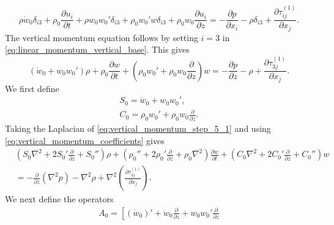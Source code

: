 \documentclass[11pt]{article}
\newenvironment{appen}{\appendix}{}
\begin{document}
\begin{appen}
\begin{equation}
  \rho \dot w_0\delta_{i3}
  + \rho_0 \frac{\partial u_i}{\partial t}
  + \rho w_0 w_0'\delta_{i3}
  + \rho_0 w_0' w \delta_{i3}
  + \rho_0 w_0 \frac{\partial u_i}{\partial z}
  =
  - \frac{\partial p}{\partial x_i}
  - \rho \delta_{i3}
  + \frac{\partial \tau_{ij}^{(1)}}{\partial x_j}.
\end{equation}
The vertical momentum equation follows by setting \(i=3\) in \eqref{eq:linear_momentum_vertical_base}. This gives
\begin{equation}\label{eq:vertical_momentum_step_5_1}
  \left(
    \dot w_0
    +
    w_0 w_0'
  \right)\rho
  +
  \rho_0 \frac{\partial w}{\partial t}
  +
  \left(
    \rho_0 w_0'
    +
    \rho_0 w_0 \frac{\partial}{\partial z}
  \right)w
  =
  -
  \frac{\partial p}{\partial z}
  -
  \rho
  +
  \frac{\partial \tau_{3j}^{(1)}}{\partial x_j}.
\end{equation}
We first define
\begin{subequations}\label{eq:vertical_momentum_coefficients}
\begin{gather}
  S_0
  =
  \dot w_0
  +
  w_0 w_0',
  \\
  C_0
  =
  \rho_0 w_0'
  +
  \rho_0 w_0 \frac{\partial}{\partial z}.
\end{gather}
\end{subequations}
Taking the Laplacian of \eqref{eq:vertical_momentum_step_5_1} and using \eqref{eq:vertical_momentum_coefficients} gives
\begin{equation}\label{eq:laplacian_vertical_momentum}
\begin{split}
  &
  \left(
    S_0 \nabla^2
    +
    2 S_0' \frac{\partial}{\partial z}
    +
    S_0''
  \right)\rho
  +
  \left(
    \rho_0''
    +
    2\rho_0' \frac{\partial}{\partial z}
    +
    \rho_0 \nabla^2
  \right)
  \frac{\partial w}{\partial t}
  +
  \left(
    C_0 \nabla^2
    +
    2 C_0' \frac{\partial}{\partial z}
    +
    C_0''
  \right)w
  \\
  &=
  -
  \frac{\partial}{\partial z}
  \left(
    \nabla^2 p
  \right)
  -
  \nabla^2 \rho
  +
  \nabla^2
  \left(
    \frac{\partial \tau_{3j}^{(1)}}{\partial x_j}
  \right).
\end{split}
\end{equation}
We next define the operators
\begin{subequations}\label{eq:poisson_operators}
\begin{gather}
  A_0
  =
  \left[
    \left(
      \dot w_0
    \right)'
    +
    \dot w_0
    \frac{\partial}{\partial z}
    +
    w_0 w_0'
    \frac{\partial}{\partial z}

\end{gather}
\end{subequations}
\end{appen}
\end{document}
